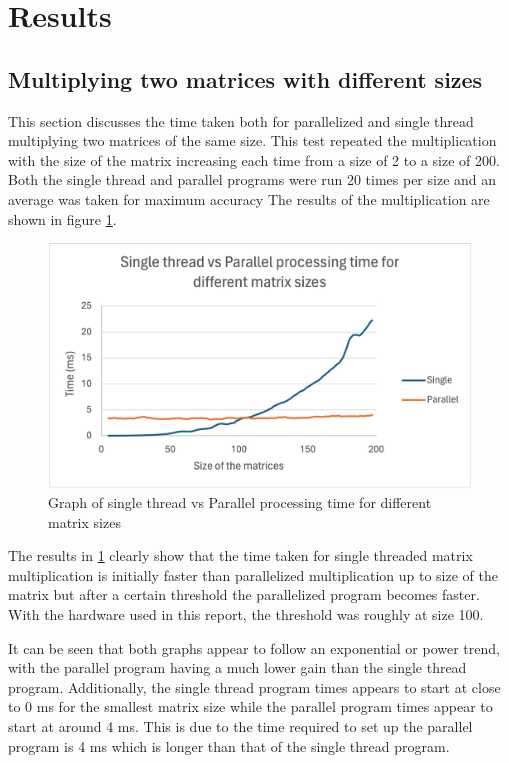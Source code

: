 \section{Results}

\subsection{Multiplying two matrices with different sizes}\label{subsec:res-sizes}
This section discusses the time taken both for parallelized and single thread  multiplying two matrices of the same size.
This test repeated the multiplication with the size of the matrix increasing each time from a size of 2 to a size of 200.
Both the single thread and parallel programs were run 20 times per size and an average was taken for maximum accuracy
The results of the multiplication are shown in figure \ref{fig:Single_thread_vs_Parallel_processing_time}.

\begin{figure}[H]
    \centering
    \includegraphics[width=0.8\columnwidth]{Figures/Single_thread_vs_Parallel_processing_time_for_different_matrix_sizes}
    \caption{Graph of single thread vs Parallel processing time for different matrix sizes}
    \label{fig:Single_thread_vs_Parallel_processing_time}
\end{figure}

The results in \ref{fig:Single_thread_vs_Parallel_processing_time} clearly show that the time taken for single threaded matrix multiplication is initially faster than parallelized multiplication up to size of the matrix but after a certain threshold the parallelized program becomes faster.
With the hardware used in this report, the threshold was roughly at size 100.


It can be seen that both graphs appear to follow an exponential or power trend, with the parallel program having a much lower gain than the single thread program.
Additionally, the single thread program times appears to start at close to 0 ms for the smallest matrix size while the parallel program times appear to start at around 4 ms.
This is due to the time required to set up the parallel program is 4 ms which is longer than that of the single thread program.


